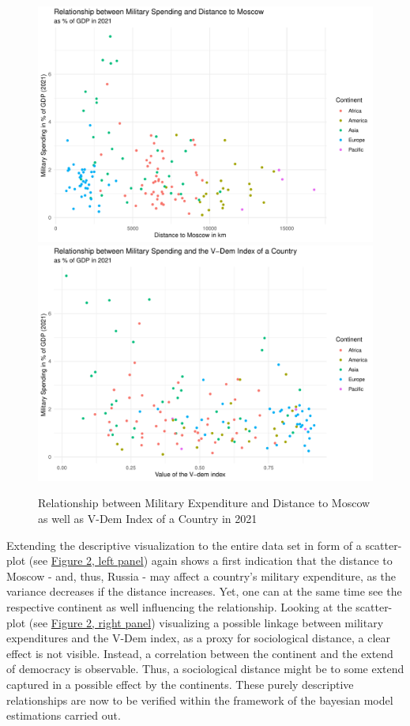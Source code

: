 \documentclass[12pt,a4paper]{article}
\begin{document}
\clearpage
\begin{figure}
\center
\label{F:2}
\includegraphics[scale=0.36]{Plot2.pdf}
\includegraphics[scale=0.36]{Plot3.pdf}
\caption{Relationship between Military Expenditure and Distance to Moscow as well as V-Dem Index of a Country in 2021}
\end{figure}

Extending the descriptive visualization to the entire data set in form of a scatter-plot (see \hyperref[F:2]{\color{blue}Figure 2, left panel}) again shows a first indication that the distance to Moscow - and, thus, Russia - may affect a country's military expenditure, as the variance decreases if the distance increases. Yet, one can at the same time see the respective continent as well influencing the relationship. Looking at the scatter-plot (see \hyperref[F:2]{\color{blue}Figure 2, right panel}) visualizing a possible linkage between military expenditures and the V-Dem index, as a proxy for sociological distance, a clear effect is not visible.  Instead, a correlation between the continent and the extend of democracy is observable. Thus, a sociological distance might be to some extend captured in a possible effect by the continents. These purely descriptive relationships are now to be verified within the framework of the bayesian model estimations carried out.  
\end{document}
